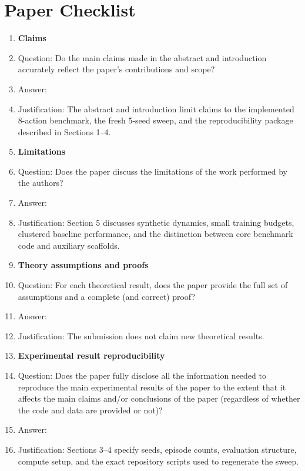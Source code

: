 \section*{Paper Checklist}

\begin{enumerate}

\item {\bf Claims}
    \item[] Question: Do the main claims made in the abstract and introduction accurately reflect the paper's contributions and scope?
    \item[] Answer: \answerYes{}
    \item[] Justification: The abstract and introduction limit claims to the implemented 8-action benchmark, the fresh 5-seed sweep, and the reproducibility package described in Sections 1--4.

\item {\bf Limitations}
    \item[] Question: Does the paper discuss the limitations of the work performed by the authors?
    \item[] Answer: \answerYes{}
    \item[] Justification: Section 5 discusses synthetic dynamics, small training budgets, clustered baseline performance, and the distinction between core benchmark code and auxiliary scaffolds.

\item {\bf Theory assumptions and proofs}
    \item[] Question: For each theoretical result, does the paper provide the full set of assumptions and a complete (and correct) proof?
    \item[] Answer: \answerNA{}
    \item[] Justification: The submission does not claim new theoretical results.

\item {\bf Experimental result reproducibility}
    \item[] Question: Does the paper fully disclose all the information needed to reproduce the main experimental results of the paper to the extent that it affects the main claims and/or conclusions of the paper (regardless of whether the code and data are provided or not)?
    \item[] Answer: \answerYes{}
    \item[] Justification: Sections 3--4 specify seeds, episode counts, evaluation structure, compute setup, and the exact repository scripts used to regenerate the sweep.


\end{enumerate}
